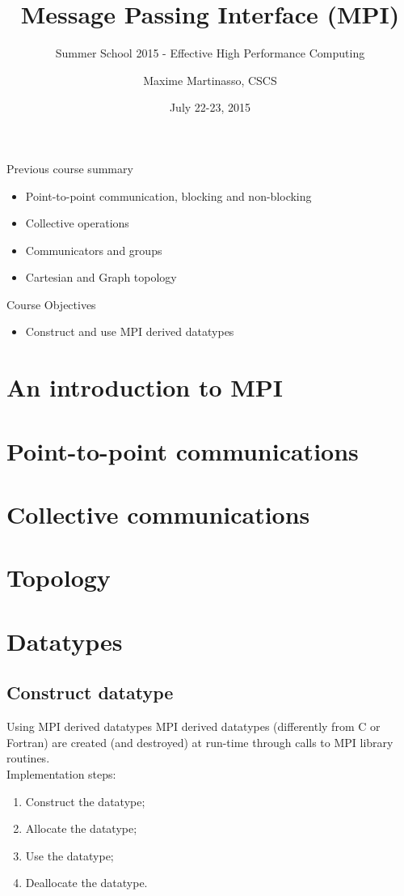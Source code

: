 \documentclass[aspectratio=43]{beamer}
\author{Maxime Martinasso, CSCS}
\title{Message Passing Interface (MPI)}
\subtitle{Summer School 2015 - Effective High Performance Computing}
\date{July 22-23, 2015}
\begin{document}
\cscstitle

\begin{frame}{Previous course summary}
\begin{itemize}
\item Point-to-point communication, blocking and non-blocking
\item Collective operations
\item Communicators and groups
\item Cartesian and Graph topology
\end{itemize}
\end{frame}

\begin{frame}{Course Objectives}
\begin{itemize}
\item Construct and use MPI derived datatypes
\end{itemize}
\end{frame}


\section{An introduction to MPI}
\section{Point-to-point communications}
\section{Collective communications}
\section{Topology}
\section{Datatypes}


\subsection{Construct datatype}

\begin{frame}[fragile]{Using MPI derived datatypes}
MPI derived datatypes (differently from C or Fortran) are created (and destroyed) at run-time through calls to MPI library routines.\\
Implementation steps:
\begin{enumerate}
\item Construct the datatype;
\item Allocate the datatype;
\item Use the datatype;
\item Deallocate the datatype.
\end{enumerate}
\end{frame}
\end{document}
